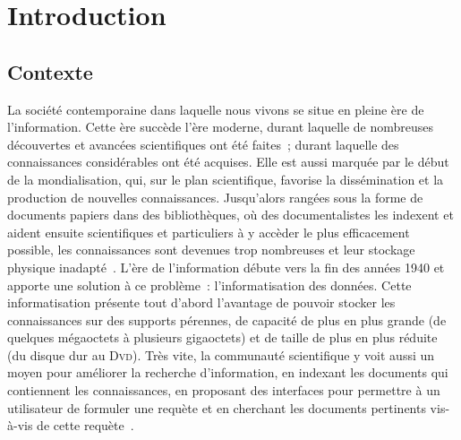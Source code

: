 \chapter{Introduction}
\label{chap:main-introduction}


  \section{Contexte}
  \label{sec:main-introduction-context}
    La société contemporaine dans laquelle nous vivons se situe en pleine ère de
    l'information. Cette ère succède l'ère moderne, durant laquelle de
    nombreuses découvertes et avancées scientifiques ont été faites~; durant
    laquelle des connaissances considérables ont été acquises. Elle  est aussi
    marquée par le début de la mondialisation, qui, sur le plan scientifique,
    favorise la dissémination et la production de nouvelles connaissances.
    Jusqu'alors rangées sous la forme de documents papiers dans des
    bibliothèques, où des documentalistes les indexent et aident ensuite
    scientifiques et particuliers à y accèder le plus efficacement possible, les
    connaissances sont devenues trop nombreuses et leur stockage physique
    inadapté~\cite{rider1946thegreatdilemmaofworldorganization}. L'ère de
    l'information débute vers la fin des années 1940 et apporte une solution à
    ce problème~: l'informatisation des données. Cette informatisation présente
    tout d'abord l'avantage de pouvoir stocker les connaissances sur des
    supports pérennes, de capacité de plus en plus grande (de quelques
    mégaoctets à plusieurs gigaoctets) et de taille de plus en plus réduite (du
    disque dur au \textsc{Dvd}). Très vite, la communauté scientifique y voit
    aussi un moyen pour améliorer la recherche d'information, en indexant les
    documents qui contiennent les connaissances, en proposant des interfaces
    pour permettre à un utilisateur de formuler une requète et en cherchant les
    documents pertinents vis-à-vis de cette requète~\cite{salton1975tfidf}.

